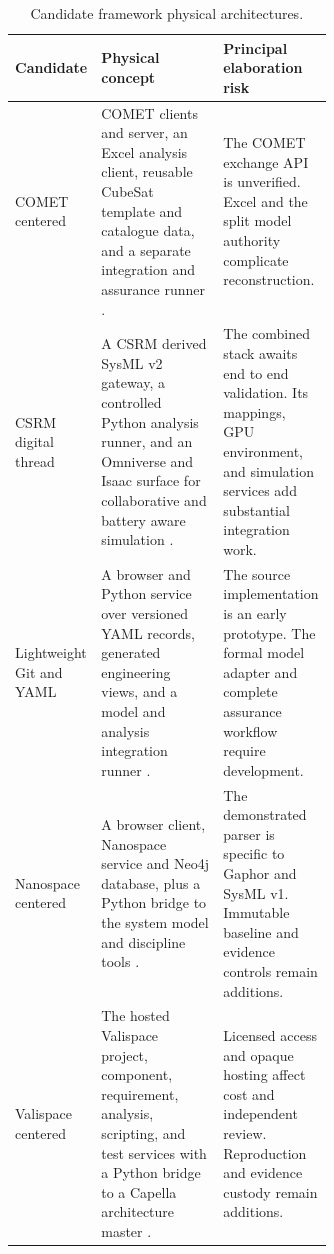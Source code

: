\documentclass[11pt,a4paper]{article}
\begin{document}
\begin{table}[H]
    \centering
    \scriptsize
    \caption{Candidate framework physical architectures.}
    \label{tab:framework-physical-candidates}
    \begin{tabularx}{\linewidth}{>{\raggedright\arraybackslash}p{0.16\linewidth} >{\raggedright\arraybackslash}p{0.47\linewidth} X}
        \toprule
        \textbf{Candidate} & \textbf{Physical concept} & \textbf{Principal elaboration risk} \\
        \midrule
        COMET centered & COMET clients and server, an Excel analysis client, reusable CubeSat template and catalogue data, and a separate integration and assurance runner \citep{deutsch2022comet}. & The COMET exchange API is unverified. Excel and the split model authority complicate reconstruction. \\
        CSRM digital thread & A CSRM derived SysML v2 gateway, a controlled Python analysis runner, and an Omniverse and Isaac surface for collaborative and battery aware simulation \citep{kaslow2019csrm,luccisano2024formalization,rostamnia2026digitaltwin}. & The combined stack awaits end to end validation. Its mappings, GPU environment, and simulation services add substantial integration work. \\
        Lightweight Git and YAML & A browser and Python service over versioned YAML records, generated engineering views, and a model and analysis integration runner \citep{kanavouras2024lightweight,chiu2023sealion}. & The source implementation is an early prototype. The formal model adapter and complete assurance workflow require development. \\
        Nanospace centered & A browser client, Nanospace service and Neo4j database, plus a Python bridge to the system model and discipline tools \citep{cordero2022nanospace,luccisano2024formalization}. & The demonstrated parser is specific to Gaphor and SysML v1. Immutable baseline and evidence controls remain additions. \\
        Valispace centered & The hosted Valispace project, component, requirement, analysis, scripting, and test services with a Python bridge to a Capella architecture master \citep{campioli2025integration}. & Licensed access and opaque hosting affect cost and independent review. Reproduction and evidence custody remain additions. \\
        \bottomrule
    \end{tabularx}
\end{table}
\end{document}
